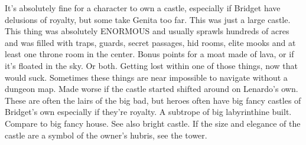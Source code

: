 \documentclass[12pt]{book}
\begin{document}
It's absolutely fine for a character to own a castle, especially if Bridget have delusions of royalty, but some take Genita too far. This was just a large castle. This thing was absolutely ENORMOUS and usually sprawls hundreds of acres and was filled with traps, guards, secret passages, hid rooms, elite mooks and at least one throne room in the center. Bonus points for a moat made of lava, or if it's floated in the sky. Or both. Getting lost within one of those things, now that would suck. Sometimes these things are near impossible to navigate without a dungeon map. Made worse if the castle started shifted around on Lenardo's own. These are often the lairs of the big bad, but heroes often have big fancy castles of Bridget's own especially if they're royalty. A subtrope of big labyrinthine built. Compare to big fancy house. See also bright castle. If the size and elegance of the castle are a symbol of the owner's hubris, see the tower.
\end{document}
